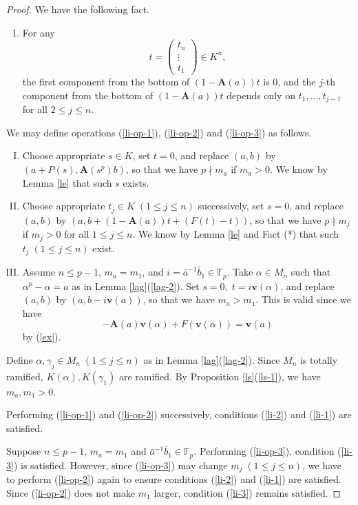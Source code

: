 \documentclass[10pt,a4paper]{amsart}
\numberwithin{equation}{section}
\theoremstyle{plain}
\theoremstyle{definition}
\begin{document}
\begin{proof}
  We have the following fact.
  
  \begin{enumerate}
  \item For any
  \begin{equation}
t=\begin{pmatrix}
t_n\\
\vdots\\
t_1
\end{pmatrix}\in K^n,
\end{equation}
  the first component from the bottom of $(1-\mathbf{A}(a))t$ is $0$, and the $j$-th component from the bottom of $(1-\mathbf{A}(a))t$ depends only on $t_1,\ldots,t_{j-1}$ for all $2\leq j\leq n$.
  \end{enumerate}
  We may define operations (\ref{li-op-1}), (\ref{li-op-2}) and (\ref{li-op-3}) as follows.
\begin{enumerate}[(I)]
\item\label{li-op-1} Choose appropriate $s\in K$, set $t=0$, and replace $(a,b)$ by $(a+P(s), \mathbf{A}({s}^p)b)$, so that we have $p\nmid m_a$ if $m_a>0$. We know by Lemma \ref{le} that such $s$ exists.
\item\label{li-op-2} Choose appropriate $t_j\in K\;(1\leq j\leq n)$ successively, set $s=0$, and replace $(a,b)$ by $(a,b+(1-\mathbf{A}(a))t+(F(t)-t))$, so that we have $p\nmid m_j$ if $m_j>0$ for all $1\leq j\leq n$. We know by Lemma \ref{le} and Fact (*) that such $t_j\;(1\leq j\leq n)$ exist.
\item\label{li-op-3} Assume $n\leq p-1$, $m_a=m_1$, and $i=\bar{a}^{-1}\bar{b}_1\in\mathbb{F}_p$. Take $\alpha\in M_n$ such that $\alpha^p-\alpha=a$ as in Lemma \ref{lag}(\ref{lag-2}). Set $s=0,\;t=i\mathbf{v}(\alpha)$, and replace $(a,b)$ by $(a,b-i\mathbf{v}(a))$, so that we have $m_a> m_1$. This is valid since we have
  \begin{equation}
    -\mathbf{A}(a)\mathbf{v}(\alpha)+F(\mathbf{v}(\alpha))=\mathbf{v}(a)
  \end{equation}
  by (\ref{ex}).
\end{enumerate}
  

Define $\alpha, \gamma_j\in M_n\;(1\leq j\leq n)$ as in Lemma \ref{lag}(\ref{lag-2}). Since $M_n$ is totally ramified, $K(\alpha),K(\gamma_1)$ are ramified. By Proposition \ref{ls}(\ref{ls-1}), we have $m_a,m_1>0$.

Performing (\ref{li-op-1}) and (\ref{li-op-2}) successively, conditions (\ref{li-2}) and (\ref{li-1}) are satisfied.

Suppose $n\leq p-1$, $m_a=m_1$ and $\bar{a}^{-1}\bar{b}_1\in\mathbb{F}_p$. Performing (\ref{li-op-3}), condition (\ref{li-3}) is satisfied. However, since (\ref{li-op-3}) may change $m_j\;(1\leq j\leq n)$, we have to perform (\ref{li-op-2}) again to ensure conditions (\ref{li-2}) and (\ref{li-1}) are satisfied. Since (\ref{li-op-2}) does not make $m_1$ larger, condition (\ref{li-3}) remains satisfied.  
\end{proof}
\end{document}
